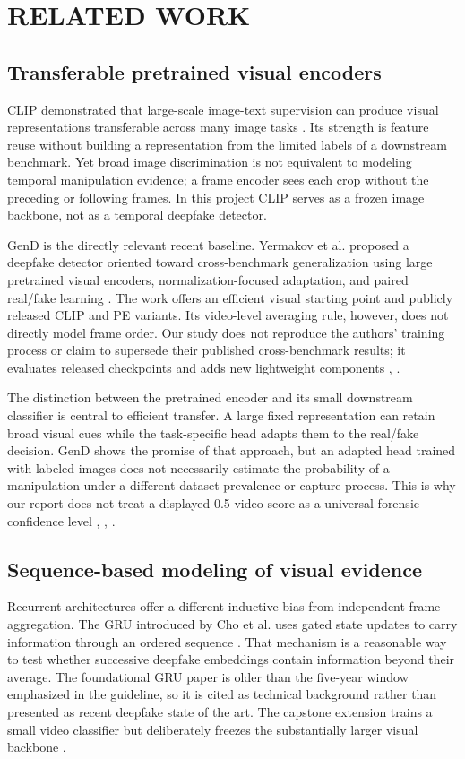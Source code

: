 \documentclass[conference,10pt]{IEEEtran}
\begin{document}
\FloatBarrier
\clearpage
\section{RELATED WORK}
\subsection{Transferable pretrained visual encoders}
CLIP demonstrated that large-scale image-text supervision can produce visual representations transferable across many image tasks \cite{radford2021}. Its strength is feature reuse without building a representation from the limited labels of a downstream benchmark. Yet broad image discrimination is not equivalent to modeling temporal manipulation evidence; a frame encoder sees each crop without the preceding or following frames. In this project CLIP serves as a frozen image backbone, not as a temporal deepfake detector.

GenD is the directly relevant recent baseline. Yermakov et al. proposed a deepfake detector oriented toward cross-benchmark generalization using large pretrained visual encoders, normalization-focused adaptation, and paired real/fake learning \cite{yermakov2026}. The work offers an efficient visual starting point and publicly released CLIP and PE variants. Its video-level averaging rule, however, does not directly model frame order. Our study does not reproduce the authors’ training process or claim to supersede their published cross-benchmark results; it evaluates released checkpoints and adds new lightweight components \cite{yermakov2026}, \cite{capstone2026}.

The distinction between the pretrained encoder and its small downstream classifier is central to efficient transfer. A large fixed representation can retain broad visual cues while the task-specific head adapts them to the real/fake decision. GenD shows the promise of that approach, but an adapted head trained with labeled images does not necessarily estimate the probability of a manipulation under a different dataset prevalence or capture process. This is why our report does not treat a displayed 0.5 video score as a universal forensic confidence level \cite{yermakov2026}, \cite{radford2021}, \cite{capstone2026}.

\subsection{Sequence-based modeling of visual evidence}
Recurrent architectures offer a different inductive bias from independent-frame aggregation. The GRU introduced by Cho et al. uses gated state updates to carry information through an ordered sequence \cite{cho2014}. That mechanism is a reasonable way to test whether successive deepfake embeddings contain information beyond their average. The foundational GRU paper is older than the five-year window emphasized in the guideline, so it is cited as technical background rather than presented as recent deepfake state of the art. The capstone extension trains a small video classifier but deliberately freezes the substantially larger visual backbone \cite{capstone2026}.
\end{document}
